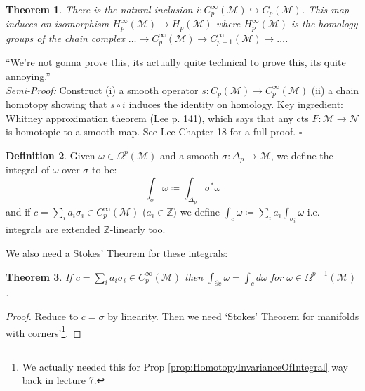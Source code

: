 \documentclass[10pt]{article}
\theoremstyle{plain}
\newtheorem{thm}{Theorem}[section] %
\theoremstyle{definition}
\newtheorem{defn}[thm]{Definition} %
\newenvironment{semiproof}{\textit{Semi-Proof:}}{\hfill$\square$}
\newcommand{\man}{\mathcal{M}}
\newcommand{\nan}{\mathcal{N}}
\newcommand{\pformman}[1]{\Omega^{#1}(\man)}
\newcommand{\dw}{d\omega}
\newcommand{\Zint}{\mathbb{Z}}
\newcommand{\mysection}[1]{
    \setcounter{thm}{0}
    \section*{#1}
    \addcontentsline{toc}{section}{#1}
    \addtocounter{section}{1}
    \setcounter{subsection}{0}

}
\begin{document}
\begin{thm}
    There is the natural inclusion $i:C^\infty_p(\man)\hookrightarrow C_p(\man)$. This map induces an isomorphism $H^\infty _p (\man) \to H_p(\man)$ where $H^\infty_p(\man)$ is the homology groups of the chain complex $\ldots \to C_p^\infty(\man) \to C_{p-1}^\infty(\man)\to \ldots$.
\end{thm}
``We're not gonna prove this, its actually quite technical to prove this, its quite annoying.''\\
\begin{semiproof}
    Construct (i) a smooth operator $s: C_p(\man) \to C_p^\infty(\man)$ (ii) a chain homotopy showing that $s\circ i$ induces the identity on homology. Key ingredient: Whitney approximation theorem (Lee p. 141), which says that any cts $F:\man \to \nan$ is homotopic to a smooth map. See Lee Chapter 18 for a full proof.
\end{semiproof}
\begin{defn}
    Given $\omega \in \pformman{p}$ and a smooth $\sigma: \Delta_p \to \man$, we define the integral of $\omega$ over $\sigma$ to be:
$$\int_\sigma \omega \coloneqq \int_{\Delta_p} \sigma^* \omega$$
and if $c = \sum_i a_i \sigma_i \in C_p^\infty(\man)$ ($a_i\in\Zint)$ we define $\int_c \omega \coloneqq \sum_i a_i \int_{\sigma_i} \omega$ i.e. integrals are extended $\Zint$-linearly too.
\end{defn}

We also need a Stokes' Theorem for these integrals:
\begin{thm}
    If $c = \sum_i a_i \sigma_i \in C_p^\infty(\man) $ then $\int_{\partial c} \omega = \int_c \dw$ for $\omega \in \pformman{p-1}$.
\end{thm}
\begin{proof}
    Reduce to $c = \sigma$ by linearity. Then we need `Stokes' Theorem for manifolds with corners'\footnote{We actually needed this for Prop \ref{prop:HomotopyInvarianceOfIntegral} way back in lecture 7.}.
\end{proof}
\end{document}
